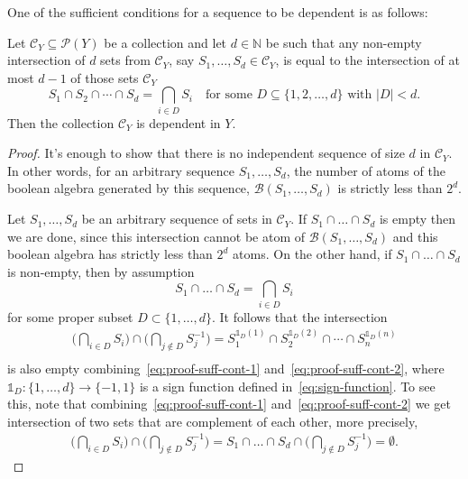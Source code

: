 One of the sufficient conditions for a sequence to be dependent is as follows:
\begin{lemma}{\label{lem:suff-cond-dependencty}}
    Let $\mathcal{C}_Y \subseteq \mathcal{P}(Y)$ be a collection and let $d \in \mathbb{N}$ be such that any non-empty intersection of $d$ sets from $\mathcal{C}_Y$, say $S_1, \dots, S_d \in \mathcal{C}_Y$, is equal to the intersection of at most $d-1$ of those sets $\mathcal{C}_Y$
    \[
        S_1 \cap S_2 \cap \cdots \cap S_d = \bigcap_{i\in D} S_i \quad \text{for some } D \subseteq \{1, 2, \ldots, d\} \text{ with } |D| < d.
    \]
    Then the collection $\mathcal{C}_Y$ is dependent in $Y$.
\end{lemma}

\begin{proof}

    It's enough to show that there is no independent sequence of size $d$ in $\mathcal{C}_Y$. In other words, for an arbitrary sequence $S_1, \dots, S_d$, the number of atoms of the boolean algebra generated by this sequence, $\mathcal{B}(S_1, \dots, S_d)$ is strictly less than $2^d$.

    Let $S_1, \dots, S_d$ be an arbitrary sequence of sets in $\mathcal{C}_Y$. If $S_1 \cap \dots \cap S_d$ is empty then we are done, since this intersection cannot be atom of $\mathcal{B}(S_1, \dots, S_d)$ and this boolean algebra has strictly less than $2^d$ atoms. On the other hand, if $S_1 \cap \dots \cap S_d$ is non-empty, then by assumption
    \begin{equation}
        \label{eq:proof-suff-cont-1}
        S_1 \cap \dots \cap S_d = \bigcap_{i \in D} S_i
    \end{equation}
    for some proper subset $D \subset \{1, \dots, d\}$. It follows that the intersection
    \begin{equation}
        \label{eq:proof-suff-cont-2}
        \begin{aligned}
            \bigl(\bigcap_{i \in D} S_i\bigr) \cap \bigl(\bigcap_{j \not \in D} S^{-1}_j\bigr) =  S_1^{\mathds{1}_D(1)} \cap S_2^{\mathds{1}_D(2)} \cap \cdots \cap S_n^{\mathds{1}_D(n)}\\
        \end{aligned}
    \end{equation}
    is also empty combining~\ref{eq:proof-suff-cont-1} and~\ref{eq:proof-suff-cont-2}, where $\mathds{1}_{D}: \{1, \dots, d\} \to \{-1, 1\}$ is a sign function defined in~\ref{eq:sign-function}. To see this, note that combining~\ref{eq:proof-suff-cont-1} and~\ref{eq:proof-suff-cont-2} we get intersection of two sets that are complement of each other, more precisely,
    \[
        \begin{aligned}
            \bigl(\bigcap_{i \in D} S_i\bigr) \cap \bigl(\bigcap_{j \not \in D} S^{-1}_j\bigr) = S_1 \cap \dots \cap S_d \cap \bigl(\bigcap_{j \not \in D} S^{-1}_j\bigr) = \emptyset.
        \end{aligned}
    \]
\end{proof}

